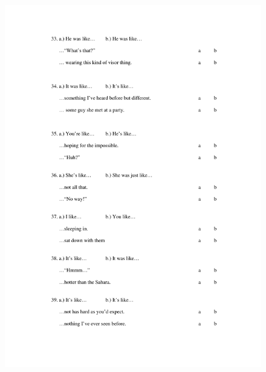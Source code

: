 \begin{figure}[htbp]
	\centering
		\includegraphics[width=5in]{images/Exp1page6.pdf}
	\label{x1p6}
\end{figure}

